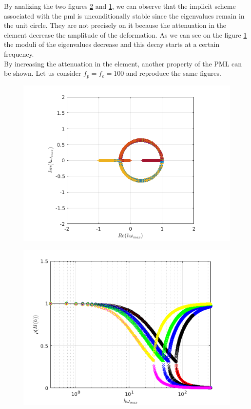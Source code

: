 \begin{itemize}
\begin{figure}[H]
\begin{minipage}{.5\textwidth}
  \label{fig:spect_rad_pml_imp_10}
\end{minipage}
\end{figure} 
By analizing the two figures \ref{fig:eig_pml_imp_10} and \ref{fig:spect_rad_pml_imp_10}, we can observe that the implicit scheme associated with the pml is unconditionally stable since the eigenvalues remain in the unit circle. They are not precisely on it because the attenuation in the element decrease the amplitude of the deformation. As we can see on the figure \ref{fig:spect_rad_pml_imp_10} the moduli of the eigenvalues decrease and this decay starts at a certain frequency.\\
By increasing the attenuation in the element, another property of the PML can be shown. Let us consider $f_p = f_e = 100$ and reproduce the same figures. 
\begin{figure}[H]
\centering
\begin{minipage}{.5\textwidth}
  \centering
  \includegraphics[width=1.\linewidth]{images/eig_pml_imp_10.png}
  \label{fig:eig_pml_imp_10}
\end{minipage}%
\begin{minipage}{.5\textwidth}
  \centering
  \includegraphics[width=1.\linewidth]{images/spect_rad_pml_imp_10.png}

\end{minipage}
\end{figure}
\end{itemize}
